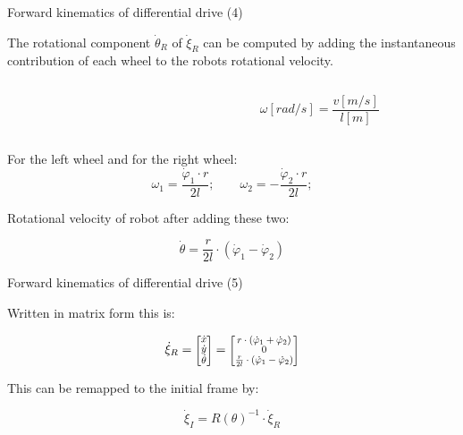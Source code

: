 \documentclass[compress]{beamer}
\newcommand{\colvec}[2][.8]{%
  \scalebox{#1}{%
    \renewcommand{\arraystretch}{.8}%
    $\begin{bmatrix}#2\end{bmatrix}$%
  }
}
\begin{document}
\begin{frame}{Forward kinematics of differential drive (4)}

    The rotational component $\dot\theta_R$ of $\dot\xi_R$ can be computed by adding the instantaneous
contribution of each wheel to the robots rotational velocity.

    \begin{columns}
        \begin{column}{0.5\linewidth}
            \centering

        \end{column}
        \begin{column}{0.5\linewidth}
            \[
                \omega [rad/s] = \frac{v [m/s]}{l [m]}
            \]
        \end{column}
    \end{columns}


For the left wheel and for the right wheel:
\[
    \omega_1 = \frac{\dot\varphi_1\cdot r}{2l};\qquad \omega_2 = -\frac{\dot\varphi_2\cdot r}{2l};
\]

Rotational velocity of robot after adding these two:

\[
    \dot\theta = \frac{r}{2l}\cdot (\dot\varphi_1 - \dot\varphi_2)
\]

\end{frame}

\begin{frame}{Forward kinematics of differential drive (5)}

Written in matrix form this is:

\[
    \dot\xi_R = \colvec{\dot{x} \\ \dot{y} \\ \dot\theta} = \colvec{r\cdot (\dot\varphi_1 + \dot\varphi_2) \\ 0 \\ \frac{r}{2l}\cdot (\dot\varphi_1 - \dot\varphi_2)}
\]


This can be remapped to the initial frame by:

\[
    \dot\xi_I = R(\theta)^{-1}\cdot \dot\xi_R
\]

\end{frame}
\end{document}
